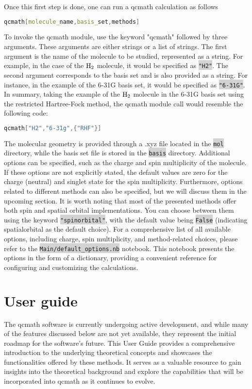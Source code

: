 \documentclass[aip,jcp,reprint,noshowkeys,superscriptaddress]{revtex4-1}
\newcommand{\keyword}[1]{{\colorbox{lightgray}{\texttt{#1}}}}
\begin{document}
Once this first step is done, one can run a qcmath calculation as follows
\begin{lstlisting}[extendedchars=true,language=Mathematica]
qcmath[molecule_name,basis_set,methods]
\end{lstlisting}
To invoke the qcmath module, use the keyword "qcmath" followed by three arguments. These arguments are either strings or a list of strings. The first argument is the name of the molecule to be studied, represented as a string. For example, in the case of the $\ce{H2}$ molecule, it would be specified as \keyword{"H2"}. The second argument corresponds to the basis set and is also provided as a string. For instance, in the example of the 6-31G basis set, it would be specified as \keyword{"6-31G"}. In summary, taking the example of the $\ce{H2}$ molecule in the 6-31G basis set using the restricted Hartree-Fock method, the qcmath module call would resemble the following code:
\begin{lstlisting}[extendedchars=true,language=Mathematica]
qcmath["H2","6-31g",{"RHF"}]
\end{lstlisting}
The molecular geometry is provided through a .xyz file located in the \keyword{mol} directory, while the basis set file is stored in the \keyword{basis} directory. Additional options can be specified, such as the charge and spin multiplicity of the molecule. If these options are not explicitly stated, the default values are zero for the charge (neutral) and singlet state for the spin multiplicity.
Furthermore, options related to different methods can also be specified, but we will discuss them in the upcoming section. It is worth noting that most of the presented methods offer both spin and spatial orbital implementations. You can choose between them using the keyword \keyword{"spinorbital"}, with the default value being \keyword{False} (indicating spatialorbital as the default choice).
For a comprehensive list of all available options, including charge, spin multiplicity, and method-related choices, please refer to the \keyword{Main/default\_options.nb} notebook. This notebook presents the options in the form of a dictionary, providing a convenient reference for configuring and customizing the calculations.

\section{User guide}
The qcmath software is currently undergoing active development, and while many of the features discussed below are not yet available, they represent the initial roadmap for the software's future. This User Guide provides a comprehensive introduction to the underlying theoretical concepts and showcases the functionalities offered by these methods. It serves as a valuable resource to gain insights into the theoretical background and explore the capabilities that will be incorporated into qcmath as it continues to evolve.
\end{document}
